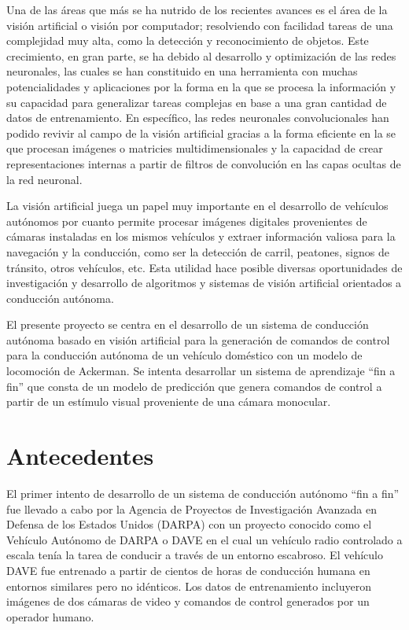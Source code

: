 \documentclass[12pt,letterpaper]{article}
\begin{document}
Una de las áreas que más se ha nutrido de los recientes avances es el área de la visión artificial o visión por computador; 
resolviendo con facilidad tareas de una complejidad muy alta, como la detección y reconocimiento de objetos. 
Este crecimiento, en gran parte, se ha debido al desarrollo y optimización de las redes neuronales, las cuales se han 
constituido en una herramienta con muchas potencialidades y aplicaciones por la forma en la que se procesa la información 
y su capacidad para generalizar tareas complejas en base a una gran cantidad de datos de entrenamiento. En específico, 
las redes neuronales convolucionales han podido revivir al campo de la visión artificial gracias a la forma eficiente 
en la se que procesan imágenes o matricies multidimensionales y la capacidad de crear representaciones internas a partir 
de filtros de convolución en las capas ocultas de la red neuronal\cite{krizhevsky2012imagenet}.

La visión artificial juega un papel muy importante en el desarrollo de vehículos autónomos por cuanto permite 
procesar imágenes digitales provenientes de cámaras instaladas en los mismos vehículos y extraer información 
valiosa para la navegación y la conducción, como ser la detección de carril, peatones, signos de tránsito, otros vehículos, 
etc. Esta utilidad hace posible diversas oportunidades de investigación y desarrollo de algoritmos y sistemas de visión 
artificial orientados a conducción autónoma.

El presente proyecto se centra en el desarrollo de un sistema de conducción autónoma basado en visión artificial para 
la generación de comandos de control para la conducción autónoma de un vehículo doméstico con un modelo de locomoción 
de Ackerman. Se intenta desarrollar un sistema de aprendizaje “fin a fin” que consta de un modelo de predicción 
que genera comandos de control a partir de un estímulo visual proveniente de una cámara monocular.


\section{Antecedentes}

El primer intento de desarrollo de un sistema de conducción autónomo “fin a fin” fue llevado a cabo por la Agencia 
de Proyectos de Investigación Avanzada en Defensa de los Estados Unidos (DARPA) con un proyecto conocido 
como el Vehículo Autónomo de DARPA o DAVE \cite{lecun2004dave} en el cual un vehículo radio controlado a escala tenía la 
tarea de conducir a través de un entorno escabroso. El vehículo DAVE fue entrenado a partir de cientos de
horas de conducción humana en entornos similares pero no idénticos. Los datos de entrenamiento 
incluyeron imágenes de dos cámaras de video y comandos de control generados por un operador humano. 
\end{document}
